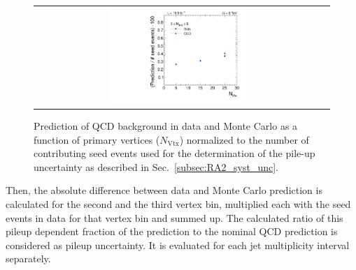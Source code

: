 \begin{figure}[!h]
  \centering
  \begin{tabular}{cc}
                \includegraphics[width=0.49\textwidth]{figures/PUUncertainty_NJet3_5.pdf}%
  \end{tabular}
  \caption{Prediction of QCD background in data and Monte Carlo as a function of primary vertices ($N_\mathrm{Vtx}$) normalized to the number of contributing seed events used for the determination of the pile-up uncertainty as described in Sec.~\ref{subsec:RA2_syst_unc}.}
  \label{fig:qcd_rs_pileup}
\end{figure}
Then, the absolute difference between data and Monte Carlo prediction is calculated for the second and the third vertex bin, multiplied each with the seed events in data for that vertex bin and summed up. %
The calculated ratio of this pileup dependent fraction of the prediction to the nominal QCD prediction is considered as pileup uncertainty. It is evaluated for each jet multiplicity interval separately. 

